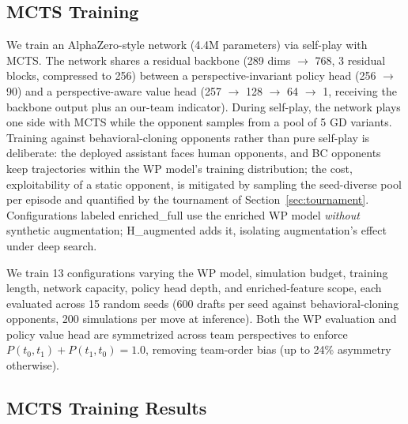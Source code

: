 \documentclass[journal]{IEEEtran}
\begin{document}
\subsection{MCTS Training}

We train an AlphaZero-style network (4.4M parameters) via self-play with MCTS. The network shares a residual backbone (289 dims $\to$ 768, 3 residual blocks, compressed to 256) between a perspective-invariant policy head (256 $\to$ 90) and a perspective-aware value head (257 $\to$ 128 $\to$ 64 $\to$ 1, receiving the backbone output plus an our-team indicator). During self-play, the network plays one side with MCTS while the opponent samples from a pool of 5 GD variants. Training against behavioral-cloning opponents rather than pure self-play is deliberate: the deployed assistant faces human opponents, and BC opponents keep trajectories within the WP model's training distribution; the cost, exploitability of a static opponent, is mitigated by sampling the seed-diverse pool per episode and quantified by the tournament of Section~\ref{sec:tournament}. Configurations labeled enriched\_full use the enriched WP model \textit{without} synthetic augmentation; H\_augmented adds it, isolating augmentation's effect under deep search.

We train 13 configurations varying the WP model, simulation budget, training length, network capacity, policy head depth, and enriched-feature scope, each evaluated across 15 random seeds (600 drafts per seed against behavioral-cloning opponents, 200 simulations per move at inference). Both the WP evaluation and policy value head are symmetrized across team perspectives to enforce $P(t_0, t_1) + P(t_1, t_0) = 1.0$, removing team-order bias (up to 24\% asymmetry otherwise).

\subsection{MCTS Training Results}
\end{document}

